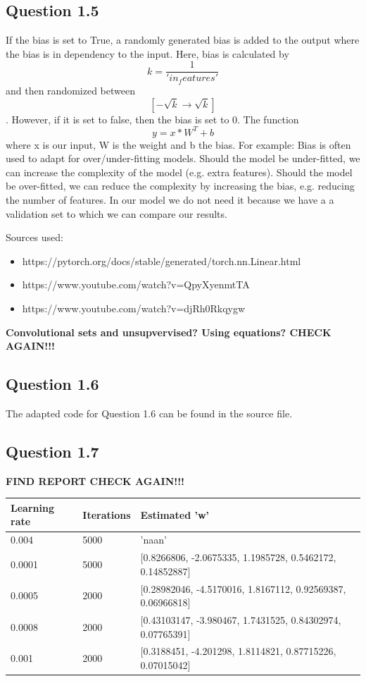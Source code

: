 \documentclass{article}
\begin{document}
\subsection{Question 1.5}

  If the bias is set to True, a randomly generated bias is added to the output where the bias is in dependency to the input. Here, bias is calculated by \[k = \frac{1}{'in_features'} \] and then randomized between \[[-\sqrt{k} \rightarrow \sqrt{k}] \]. However, if it is set to false, then the bias is set to 0. The function \[y = x*W^T + b\] where x is our input, W is the weight and b the bias. For example: 
  Bias is often used to adapt for over/under-fitting models. Should the model be under-fitted, we can increase the complexity of the model (e.g. extra features). Should the model be over-fitted, we can reduce the complexity by increasing the bias, e.g. reducing the number of features. 
  In our model we do not need it because we have a a validation set to which we can compare our results. \newline

  Sources used: 
  \begin{itemize}
  \item https://pytorch.org/docs/stable/generated/torch.nn.Linear.html
  \item https://www.youtube.com/watch?v=QpyXyenmtTA
  \item https://www.youtube.com/watch?v=djRh0Rkqygw
\end{itemize}
  
  \textbf{Convolutional sets and unsupvervised?
  Using equations? CHECK AGAIN!!!}


\subsection{Question 1.6}

The adapted code for Question 1.6 can be found in the source file.

\subsection{Question 1.7}

\textbf{FIND REPORT CHECK AGAIN!!!}

\begin{center}
    \begin{tabular}{|l|l|l|}
    \hline
          Learning rate & Iterations & Estimated 'w' \\
         \hline
         0.004&5000& 'naan' \\
         \hline
         0.0001&5000&[0.8266806, -2.0675335, 1.1985728, 0.5462172, 0.14852887] \\
         \hline
         0.0005&2000&[0.28982046, -4.5170016, 1.8167112, 0.92569387, 0.06966818]\\
         \hline
         0.0008&2000&[0.43103147, -3.980467, 1.7431525, 0.84302974, 0.07765391]\\
         \hline
         0.001&2000&[0.3188451, -4.201298, 1.8114821, 0.87715226, 0.07015042] \\
    \hline
    \end{tabular}
\end{center}
\end{document}
